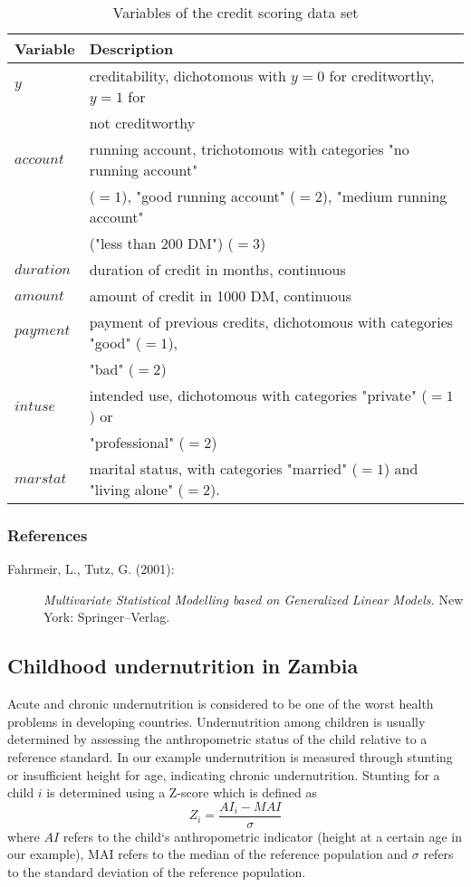 \begin{table}[ht]

\begin{tabular}{|l|l|}
\hline
{\bf Variable} & {\bf Description} \\
\hline
$y$ & creditability, dichotomous with $y=0$ for creditworthy, $y=1$ for \\
    & not creditworthy \\
$account$ & running account, trichotomous with categories "no
running account" \\& ($=1$),
    "good running account"
($=2$),  "medium running account" \\&("less than 200 DM") ($=3$)  \\
$duration$ & duration of credit in months, continuous \\
$amount$ & amount of credit in 1000 DM, continuous \\
$payment$ & payment of previous credits, dichotomous with categories "good" ($=1$), \\ & "bad" ($=2$)  \\
$intuse$ & intended use, dichotomous with categories "private" ($=1$) or \\ & "professional" ($=2$)  \\
$marstat$ & marital status, with categories "married" ($=1$) and "living alone" ($=2$). \\
\hline
\end{tabular}
{\em \caption{\label{creditdatavar}Variables of the credit scoring
data set}}
\end{table}

\subsubsection*{References}

\begin{description}
\item [Fahrmeir, L., Tutz, G. (2001):] {\it Multivariate Statistical
Modelling based on Generalized Linear Models.} New York:
Springer--Verlag.
\end{description}

\subsection{Childhood undernutrition in Zambia}
\label{zambia}  

Acute and chronic undernutrition is considered to be one of the
worst health problems in developing countries. Undernutrition
among children is usually determined by assessing the
anthropometric status of the child relative to a reference
standard. In our example undernutrition is measured through
stunting or insufficient height for age, indicating chronic
undernutrition. Stunting for a child $i$ is determined using a
Z-score which is defined as
\[Z_i = \frac{AI_i-MAI}{\sigma}\]
where $AI$ refers to the child`s anthropometric indicator (height
at a certain age in our example), MAI refers to the median of the
reference population and $\sigma$ refers to the standard deviation
of the reference population.

